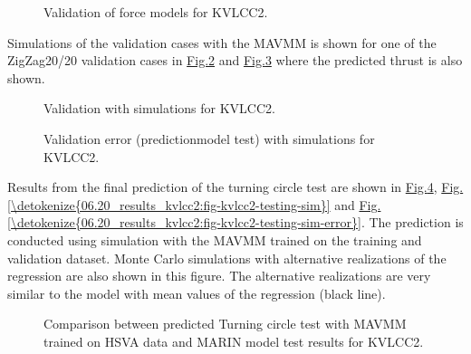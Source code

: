 \documentclass[review]{elsarticle}
\begin{document}
\begin{figure}[H]
\centering
\capstart

\noindent{}
\caption{Validation of force models for KVLCC2.}\label{\detokenize{06.20_results_kvlcc2:fig-kvlcc2-validation-forces}}\end{figure}

\sphinxAtStartPar
Simulations of the validation cases with the MAVMM is shown for one of the ZigZag20/20 validation cases in \hyperref[\detokenize{06.20_results_kvlcc2:fig-kvlcc2-validation-sim}]{Fig.\@ \ref{\detokenize{06.20_results_kvlcc2:fig-kvlcc2-validation-sim}}} and \hyperref[\detokenize{06.20_results_kvlcc2:fig-kvlcc2-validation-sim-error}]{Fig.\@ \ref{\detokenize{06.20_results_kvlcc2:fig-kvlcc2-validation-sim-error}}} where the predicted thrust is also shown.

\begin{figure}[H]
\centering
\capstart

\noindent{}
\caption{Validation with simulations for KVLCC2.}\label{\detokenize{06.20_results_kvlcc2:fig-kvlcc2-validation-sim}}\end{figure}

\begin{figure}[H]
\centering
\capstart

\noindent{}
\caption{Validation error (prediction\sphinxhyphen{}model test) with simulations for KVLCC2.}\label{\detokenize{06.20_results_kvlcc2:fig-kvlcc2-validation-sim-error}}\end{figure}

\sphinxAtStartPar
Results from the final prediction of the turning circle test are shown in  \hyperref[\detokenize{06.20_results_kvlcc2:fig-kvlcc2-track-plot-testing-sim}]{Fig.\@ \ref{\detokenize{06.20_results_kvlcc2:fig-kvlcc2-track-plot-testing-sim}}}, \hyperref[\detokenize{06.20_results_kvlcc2:fig-kvlcc2-testing-sim}]{Fig.\@ \ref{\detokenize{06.20_results_kvlcc2:fig-kvlcc2-testing-sim}}} and \hyperref[\detokenize{06.20_results_kvlcc2:fig-kvlcc2-testing-sim-error}]{Fig.\@ \ref{\detokenize{06.20_results_kvlcc2:fig-kvlcc2-testing-sim-error}}}. The prediction is conducted using simulation with the MAVMM trained on the training and validation dataset. Monte Carlo simulations with alternative realizations of the regression are also shown in this figure. The alternative realizations are very similar to the model with mean values of the regression (black line).

\begin{figure}[H]
\centering
\capstart

\noindent{}
\caption{Comparison between predicted Turning circle test with MAVMM trained on HSVA data and MARIN model test results for KVLCC2.}\label{\detokenize{06.20_results_kvlcc2:fig-kvlcc2-track-plot-testing-sim}}\end{figure}
\end{document}
